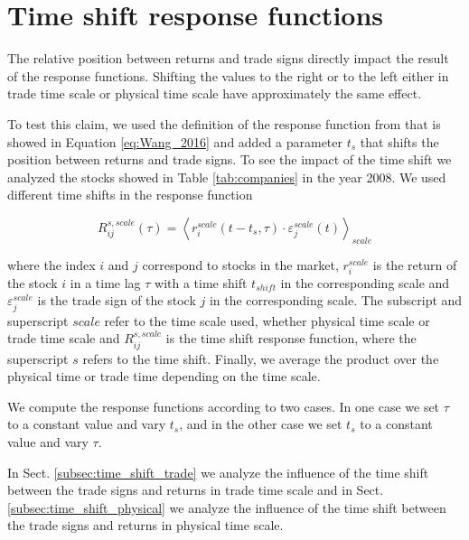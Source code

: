 \section{Time shift response functions}\label{sec:time_shift}

The relative position between returns and trade signs directly impact the
result of the response functions. Shifting the values to the right or to the
left either in trade time scale or physical time scale have approximately the
same effect.

To test this claim, we used the definition of the response function from
\cite{Wang_2016_cross} that is showed in Equation \ref{eq:Wang_2016} and added
a parameter $t_{s}$ that shifts the position between returns and trade signs.
To see the impact of the time shift we analyzed the stocks showed in Table
\ref{tab:companies} in the year 2008. We used different time shifts in the
response function

\begin{equation}\label{eq:time_shift_general}
    R_{ij}^{s, scale}\left(\tau\right)=\left\langle r^{scale}_{i}
    \left(t-t_{s},\tau\right) \cdot\varepsilon^{scale}_{j}
    \left(t\right)\right\rangle _{scale}
\end{equation}

where the index $i$ and $j$ correspond to stocks in the market, $r^{scale}_{i}$
is the return of the stock $i$ in a time lag $\tau$ with a time shift
$t_{shift}$ in the corresponding scale and $\varepsilon^{scale}_{j}$ is the
trade sign of the stock $j$ in the corresponding scale. The subscript and
superscript $scale$ refer to the time scale used, whether physical time scale
or trade time scale and $R_{ij}^{s,scale}$ is the time shift response function,
where the superscript $s$ refers to the time shift. Finally, we average the
product over the physical time or trade time depending on the time scale.

We compute the response functions according to two cases. In one case we set
$\tau$ to a constant value and vary $t_{s}$, and in the other case we set
$t_{s}$ to a constant value and vary $\tau$.

In Sect. \ref{subsec:time_shift_trade} we analyze the influence of the time
shift between the trade signs and returns in trade time scale and in Sect.
\ref{subsec:time_shift_physical} we analyze the influence of the time shift
between the trade signs and returns in physical time scale.

